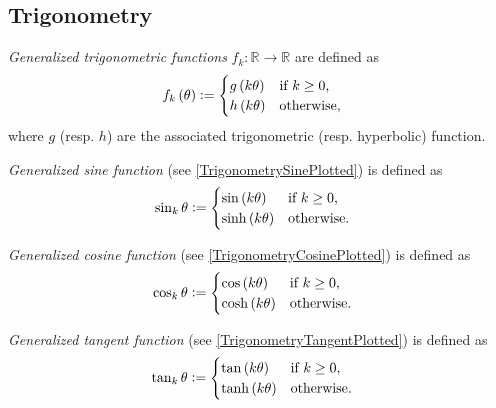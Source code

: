 \documentclass[stu, babel, american, biblatex, a4paper, draftall]{apa7}
\begin{document}
\subsection{Trigonometry}
\begin{definition}\label{Trigonometry}
    \textit{Generalized trigonometric functions} $f_k:\mathbb{R}\to\mathbb{R}$ are defined as
    \begin{align*}
        f_k\left(\theta\right) & \vcentcolon=
        \begin{cases}
            g\left(k\theta\right) & \text{if $k\geq0$,} \\
            h\left(k\theta\right) & \text{otherwise,}   \\
        \end{cases}
    \end{align*}
    where $g$ (resp. $h$) are the associated trigonometric (resp. hyperbolic) function.
\end{definition}
\begin{example}\label{TrigonometrySine}
    \textit{Generalized sine function} (see \cref{TrigonometrySinePlotted}) is defined as
    \begin{align*}
        \sin_k{\theta} & \vcentcolon=
        \begin{cases}
            \sin\left(k\theta\right)  & \text{if $k\geq0$,} \\
            \sinh\left(k\theta\right) & \text{otherwise.}   \\
        \end{cases}
    \end{align*}
\end{example}
\begin{example}\label{TrigonometryCosine}
    \textit{Generalized cosine function} (see \cref{TrigonometryCosinePlotted}) is defined as
    \begin{align*}
        \cos_k{\theta} & \vcentcolon=
        \begin{cases}
            \cos\left(k\theta\right)  & \text{if $k\geq0$,} \\
            \cosh\left(k\theta\right) & \text{otherwise.}   \\
        \end{cases}
    \end{align*}
\end{example}
\begin{example}\label{TrigonometryTangent}
    \textit{Generalized tangent function} (see \cref{TrigonometryTangentPlotted}) is defined as
    \begin{align*}
        \tan_k{\theta} & \vcentcolon=
        \begin{cases}
            \tan\left(k\theta\right)  & \text{if $k\geq0$,} \\
            \tanh\left(k\theta\right) & \text{otherwise.}   \\
        \end{cases}
    \end{align*}
\end{example}
\end{document}
